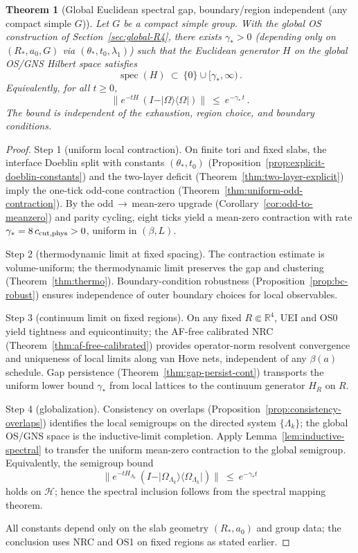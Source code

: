 \documentclass[11pt]{amsart}
\theoremstyle{plain}
\newtheorem{theorem}{Theorem}[section]
\theoremstyle{definition}
\theoremstyle{remark}
\begin{document}
\begin{theorem}[Global Euclidean spectral gap, boundary/region independent (any compact simple $G$)]\label{thm:global-gap-uncond}
Let $G$ be a compact simple group. With the global OS construction of Section~\ref{sec:global-R4}, there exists $\gamma_*>0$ (depending only on $(R_*,a_0,G)$ via $(\theta_*,t_0,\lambda_1)$) such that the Euclidean generator $H$ on the global OS/GNS Hilbert space satisfies
\[
\operatorname{spec}(H)\ \subset\ \{0\}\cup[\gamma_*,\infty)\,.
\]
Equivalently, for all $t\ge 0$,
\[
  \big\|e^{-tH}\,(I-\vert\Omega\rangle\langle\Omega\vert)\big\|\ \le\ e^{-\gamma_*\, t}\,.
\]
The bound is independent of the exhaustion, region choice, and boundary conditions.
\end{theorem}
\begin{proof}
Step 1 (uniform local contraction). On finite tori and fixed slabs, the interface Doeblin split with constants $(\theta_*,t_0)$ (Proposition~\ref{prop:explicit-doeblin-constants}) and the two-layer deficit (Theorem~\ref{thm:two-layer-explicit}) imply the one-tick odd-cone contraction (Theorem~\ref{thm:uniform-odd-contraction}). By the odd\,$\to$\,mean-zero upgrade (Corollary~\ref{cor:odd-to-meanzero}) and parity cycling, eight ticks yield a mean-zero contraction with rate $\gamma_*=8\,c_{\rm cut,phys}>0$, uniform in $(\beta,L)$.

Step 2 (thermodynamic limit at fixed spacing). The contraction estimate is volume-uniform; the thermodynamic limit preserves the gap and clustering (Theorem~\ref{thm:thermo}). Boundary-condition robustness (Proposition~\ref{prop:bc-robust}) ensures independence of outer boundary choices for local observables.

Step 3 (continuum limit on fixed regions). On any fixed $R\Subset\mathbb R^4$, UEI and OS0 yield tightness and equicontinuity; the AF-free calibrated NRC (Theorem~\ref{thm:af-free-calibrated}) provides operator-norm resolvent convergence and uniqueness of local limits along van Hove nets, independent of any $\beta(a)$ schedule. Gap persistence (Theorem~\ref{thm:gap-persist-cont}) transports the uniform lower bound $\gamma_*$ from local lattices to the continuum generator $H_R$ on $R$.

Step 4 (globalization). Consistency on overlaps (Proposition~\ref{prop:consistency-overlaps}) identifies the local semigroups on the directed system $\{\Lambda_k\}$; the global OS/GNS space is the inductive-limit completion. Apply Lemma~\ref{lem:inductive-spectral} to transfer the uniform mean-zero contraction to the global semigroup. Equivalently, the semigroup bound
\[
  \big\|e^{-tH_{\Lambda_k}}\,(I-\vert\Omega_{\Lambda_k}\rangle\langle\Omega_{\Lambda_k}\vert)\big\|\ \le\ e^{-\gamma_* t}
\]
holds on $\mathcal H$; hence the spectral inclusion follows from the spectral mapping theorem.

All constants depend only on the slab geometry $(R_*,a_0)$ and group data; the conclusion uses NRC and OS1 on fixed regions as stated earlier.
\end{proof}
\end{document}
